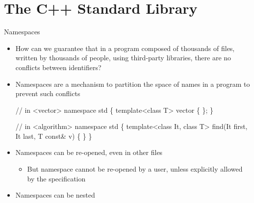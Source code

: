 

\section*{The C++ Standard Library}

\begin{frame}[fragile]{Namespaces}

  \begin{itemize}
  \item<1-> How can we guarantee that in a program composed of thousands of files,
    written by thousands of people, using third-party libraries, there are no
    conflicts between identifiers?
  \item<2-> Namespaces are a mechanism to partition the space of names in a program
    to prevent such conflicts

    \begin{codeblock}
// in <vector>
\alert{namespace std \{}
  template<class T> vector \{ \ddd \};
\alert{\}}

// in <algorithm>
\alert{namespace std \{}
  template<class It, class T> find(It first, It last, T const& v) \{ \ddd \}
\alert{\}}\end{codeblock}

  \item<3-> Namespaces can be re-opened, even in other files
  \begin{itemize}
  \item But namespace  cannot be re-opened by a user, unless
    explicitly allowed by the specification
  \end{itemize}
  \item<4-> Namespaces can be nested
  \end{itemize}

\end{frame}

